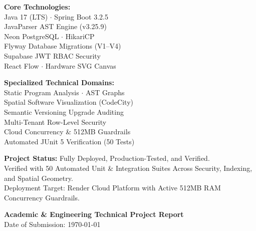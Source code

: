 \documentclass[11pt,a4paper,openany]{report}
\begin{document}
\begin{titlepage}
    \begin{minipage}{0.47\textwidth}
        \begin{flushleft} \small
            \textbf{Core Technologies:}\\
            Java 17 (LTS) $\cdot$ Spring Boot 3.2.5\\
            JavaParser AST Engine (v3.25.9)\\
            Neon PostgreSQL $\cdot$ HikariCP\\
            Flyway Database Migrations (V1--V4)\\
            Supabase JWT RBAC Security\\
            React Flow $\cdot$ Hardware SVG Canvas
        \end{flushleft}
    \end{minipage}
    \begin{minipage}{0.47\textwidth}
        \begin{flushright} \small
            \textbf{Specialized Technical Domains:}\\
            Static Program Analysis $\cdot$ AST Graphs\\
            Spatial Software Visualization (CodeCity)\\
            Semantic Versioning Upgrade Auditing\\
            Multi-Tenant Row-Level Security\\
            Cloud Concurrency \& 512MB Guardrails\\
            Automated JUnit 5 Verification (50 Tests)
        \end{flushright}
    \end{minipage}
    
    \vfill
    
    \begin{tcolorbox}[colback=codebg,colframe=bordercolor,arc=2mm,width=0.92\textwidth]
        \centering
        \scriptsize
        \textbf{Project Status:} Fully Deployed, Production-Tested, and Verified.\\
        Verified with 50 Automated Unit \& Integration Suites Across Security, Indexing, and Spatial Geometry.\\
        Deployment Target: Render Cloud Platform with Active 512MB RAM Concurrency Guardrails.
    \end{tcolorbox}
    
    \vspace{0.3cm}
    
    {\large \textbf{Academic \& Engineering Technical Project Report}}\\[0.15cm]
    {\small Date of Submission: \today}
    
    \vspace*{0.2cm}
\end{titlepage}
\end{document}
